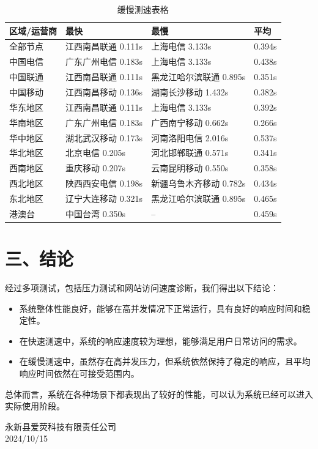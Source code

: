 \documentclass{article}
\begin{document}
\begin{table}[H]
    \centering
    \begin{tabular}{|l|l|l|l|}
        \hline
        \textbf{区域/运营商} & \textbf{最快} & \textbf{最慢} & \textbf{平均} \\ \hline
        全部节点 & 江西南昌联通 0.111s & 上海电信 3.133s & 0.394s \\ \hline
        中国电信 & 广东广州电信 0.183s & 上海电信 3.133s & 0.438s \\ \hline
        中国联通 & 江西南昌联通 0.111s & 黑龙江哈尔滨联通 0.895s & 0.351s \\ \hline
        中国移动 & 江西南昌移动 0.136s & 湖南长沙移动 1.432s & 0.382s \\ \hline
        华东地区 & 江西南昌联通 0.111s & 上海电信 3.133s & 0.392s \\ \hline
        华南地区 & 广东广州电信 0.183s & 广西南宁移动 0.662s & 0.266s \\ \hline
        华中地区 & 湖北武汉移动 0.173s & 河南洛阳电信 2.016s & 0.537s \\ \hline
        华北地区 & 北京电信 0.205s & 河北邯郸联通 0.571s & 0.341s \\ \hline
        西南地区 & 重庆移动 0.207s & 云南昆明移动 0.550s & 0.358s \\ \hline
        西北地区 & 陕西西安电信 0.198s & 新疆乌鲁木齐移动 0.782s & 0.434s \\ \hline
        东北地区 & 辽宁大连移动 0.321s & 黑龙江哈尔滨联通 0.895s & 0.465s \\ \hline
        港澳台 & 中国台湾 0.350s & -- & 0.459s \\ \hline
    \end{tabular}
    \caption{缓慢测速表格}
\end{table}

\section*{三、结论}
经过多项测试，包括压力测试和网站访问速度诊断，我们得出以下结论：
\begin{itemize}
    \item 系统整体性能良好，能够在高并发情况下正常运行，具有良好的响应时间和稳定性。
    \item 在快速测速中，系统的响应速度较为理想，能够满足用户日常访问的需求。
    \item 在缓慢测速中，虽然存在高并发压力，但系统依然保持了稳定的响应，且平均响应时间依然在可接受范围内。
\end{itemize}

总体而言，系统在各种场景下都表现出了较好的性能，可以认为系统已经可以进入实际使用阶段。\\
\vspace{2cm} %


\begin{flushright}
    \parbox{20em}{
    \raggedleft             %
    永新县爱荧科技有限责任公司 \\
    
    
    2024/10/15
    }
\end{flushright}
\end{document}
